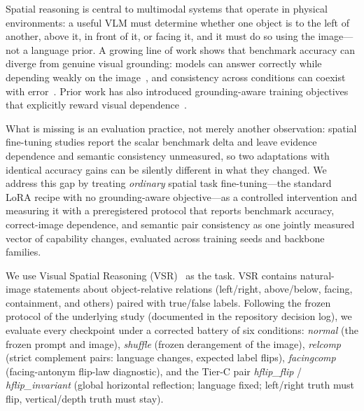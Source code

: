 Spatial reasoning is central to multimodal systems that operate in physical
environments: a useful VLM must determine whether one object is to the left
of another, above it, in front of it, or facing it, and it must do so using
the image---not a language prior. A growing line of work shows that
benchmark accuracy can diverge from genuine visual grounding: models can
answer correctly while depending weakly on the image~\cite{lan2026seeing,
zafar2026beyond,zhu2026visualflip}, and consistency across conditions can
coexist with error~\cite{bhat2026consistent}. Prior work has also
introduced grounding-aware training objectives that explicitly reward
visual dependence~\cite{zafar2026coral}.

What is missing is an evaluation practice, not merely another
observation: spatial fine-tuning studies report the scalar benchmark
delta and leave evidence dependence and semantic consistency unmeasured,
so two adaptations with identical accuracy gains can be silently
different in what they changed. We address this gap by treating
\emph{ordinary} spatial task fine-tuning---the standard LoRA recipe with
no grounding-aware objective---as a controlled intervention and measuring
it with a preregistered protocol that reports benchmark accuracy,
correct-image dependence, and semantic pair consistency as one jointly
measured vector of capability changes, evaluated across training seeds
and backbone families.

We use Visual Spatial Reasoning (VSR)~\cite{liu2023vsr} as the task.
VSR contains natural-image statements about object-relative relations
(left/right, above/below, facing, containment, and others) paired with
true/false labels. Following the frozen protocol of the underlying study
(documented in the repository decision log), we evaluate every checkpoint
under a corrected battery of six conditions: \emph{normal} (the frozen
prompt and image), \emph{shuffle} (frozen derangement of the image),
\emph{relcomp} (strict complement pairs: language changes, expected label
flips), \emph{facingcomp} (facing-antonym flip-law diagnostic), and the
Tier-C pair \emph{hflip\_flip} / \emph{hflip\_invariant} (global
horizontal reflection; language fixed; left/right truth must flip,
vertical/depth truth must stay).

